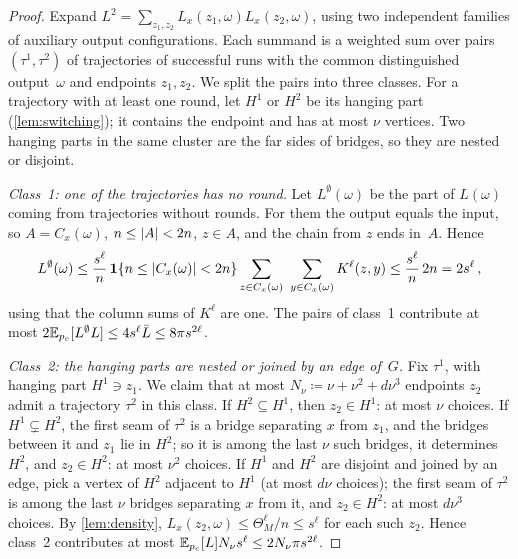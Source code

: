 \begin{proof}
Expand $L^2=\sum_{z_1,z_2}L_x(z_1,\omega)L_x(z_2,\omega)$, using two independent families of auxiliary
output configurations. Each summand is a weighted sum over pairs $(\tau^1,\tau^2)$ of trajectories of
successful runs with the common distinguished output~$\omega$ and endpoints $z_1,z_2$. We split the pairs
into three classes. For a trajectory with at least one round, let $H^1$ or $H^2$ be its hanging part
(\cref{lem:switching}); it contains the endpoint and has at most $\nu$ vertices. Two hanging parts in the
same cluster are the far sides of bridges, so they are nested or disjoint.

\emph{Class~1: one of the trajectories has no round.} Let $L^\emptyset(\omega)$ be the part of
$L(\omega)$ coming from trajectories without rounds. For them the output equals the input, so
$A=C_x(\omega)$, $n\le\lvert A\rvert<2n$, $z\in A$, and the chain from $z$ ends in~$A$. Hence
\begin{equation*}
  L^\emptyset(\omega)\le\frac{s^\ell}n\,\mathbf{1}\{n\le\lvert C_x(\omega)\rvert<2n\}\sum_{z\in C_x(\omega)}\
  \sum_{y\in C_x(\omega)}K^\ell(z,y)\le\frac{s^\ell}{n}\,2n=2s^\ell\,,
\end{equation*}
using that the column sums of $K^\ell$ are one. The pairs of class~1 contribute at most
$2\mathbb E_{p_c}[L^\emptyset L]\le4s^\ell\bar L\le8\pi s^{2\ell}$.

\emph{Class~2: the hanging parts are nested or joined by an edge of~$G$.} Fix $\tau^1$, with hanging part
$H^1\ni z_1$. We claim that at most $N_\nu\coloneqq\nu+\nu^2+d\nu^3$ endpoints $z_2$ admit a
trajectory $\tau^2$ in this class. If $H^2\subseteq H^1$, then $z_2\in H^1$: at most $\nu$ choices. If
$H^1\subsetneq H^2$, the first seam of $\tau^2$ is a bridge separating $x$ from $z_1$, and the bridges
between it and $z_1$ lie in $H^2$; so it is among the last $\nu$ such bridges, it determines $H^2$, and
$z_2\in H^2$: at most $\nu^2$ choices. If $H^1$ and $H^2$ are disjoint and joined by an edge, pick a
vertex of $H^2$ adjacent to $H^1$ (at most $d\nu$ choices); the first seam of $\tau^2$ is among the last
$\nu$ bridges separating $x$ from it, and $z_2\in H^2$: at most $d\nu^3$ choices. By
\cref{lem:density}, $L_x(z_2,\omega)\le\Theta_M^\ell/n\le s^\ell$ for each such $z_2$. Hence class~2
contributes at most $\mathbb E_{p_c}[L]N_\nu s^\ell\le2N_\nu\pi s^{2\ell}$.


\end{proof}
